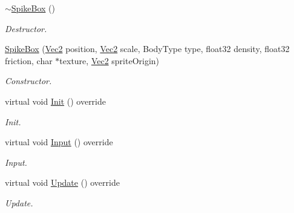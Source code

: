 \begin{DoxyCompactItemize}
\item 
\mbox{\label{class_spike_box_a1bb832d0bb94295c3bb3e3276146820e}} 
\hyperlink{class_spike_box_a1bb832d0bb94295c3bb3e3276146820e}{$\sim$\+Spike\+Box} ()
\begin{DoxyCompactList}\small\item\em Destructor. \end{DoxyCompactList}\item 
\mbox{\label{class_spike_box_a7b3d5638f34943470a0045881ea78085}} 
\hyperlink{class_spike_box_a7b3d5638f34943470a0045881ea78085}{Spike\+Box} (\hyperlink{struct_vec2}{Vec2} position, \hyperlink{struct_vec2}{Vec2} scale, Body\+Type type, float32 density, float32 friction, char $\ast$texture, \hyperlink{struct_vec2}{Vec2} sprite\+Origin)
\begin{DoxyCompactList}\small\item\em Constructor. \end{DoxyCompactList}\item 
\mbox{\label{class_spike_box_acff57f058cc8c29110fc52bc1ac66c0d}} 
virtual void \hyperlink{class_spike_box_acff57f058cc8c29110fc52bc1ac66c0d}{Init} () override
\begin{DoxyCompactList}\small\item\em Init. \end{DoxyCompactList}\item 
\mbox{\label{class_spike_box_a76956f8a2c3071869c851f77b396aa38}} 
virtual void \hyperlink{class_spike_box_a76956f8a2c3071869c851f77b396aa38}{Input} () override
\begin{DoxyCompactList}\small\item\em Input. \end{DoxyCompactList}\item 
\mbox{\label{class_spike_box_a546f46c449d79576a6dd364dd28f08e6}} 
virtual void \hyperlink{class_spike_box_a546f46c449d79576a6dd364dd28f08e6}{Update} () override
\begin{DoxyCompactList}\small\item\em Update. \end{DoxyCompactList}\item 
\mbox{\label{class_spike_box_a367ab98224d87535dcd037ee46de2231}} 

\end{DoxyCompactItemize}
